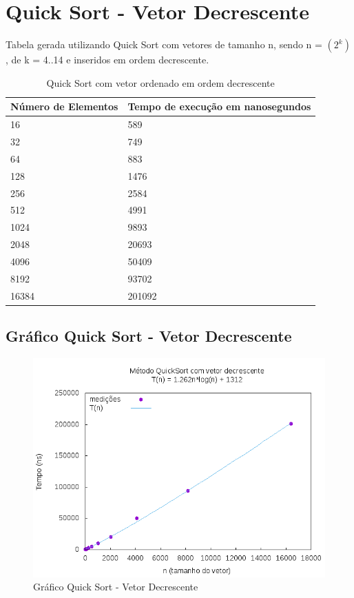 \documentclass[12pt,a4paper,twoside]{report}
\begin{document}
\section{Quick Sort - Vetor Decrescente}
Tabela gerada utilizando Quick Sort com vetores de tamanho n, sendo n = $(2^k)$, de k = 4..14 e inseridos em ordem decrescente.
\begin{table}[H]
\centering
\caption{Quick Sort com vetor ordenado em ordem decrescente}
\label{my-label}
\begin{tabular}{|l|l|}
\hline
\multicolumn{1}{|c|}{\textbf{Número de Elementos}} & \multicolumn{1}{c|}{\textbf{Tempo de execução em nanosegundos}} \\ \hline
16 & 589 \\ \hline
32 & 749 \\ \hline
64 & 883 \\ \hline
128 & 1476 \\ \hline
256 & 2584 \\ \hline
512 & 4991 \\ \hline
1024 & 9893 \\ \hline
2048 & 20693 \\ \hline
4096 & 50409 \\ \hline
8192 & 93702 \\ \hline
16384 & 201092 \\ \hline
\end{tabular}
\end{table}

\subsection{Gráfico Quick Sort - Vetor Decrescente}
\begin{figure}[H]
    \centering
    \includegraphics[width=0.7\linewidth]{graficos/QuickSort/vIntDecrescente/vIntDecrescente.png}
  \caption{Gráfico Quick Sort - Vetor Decrescente}
\end{figure}
\end{document}
